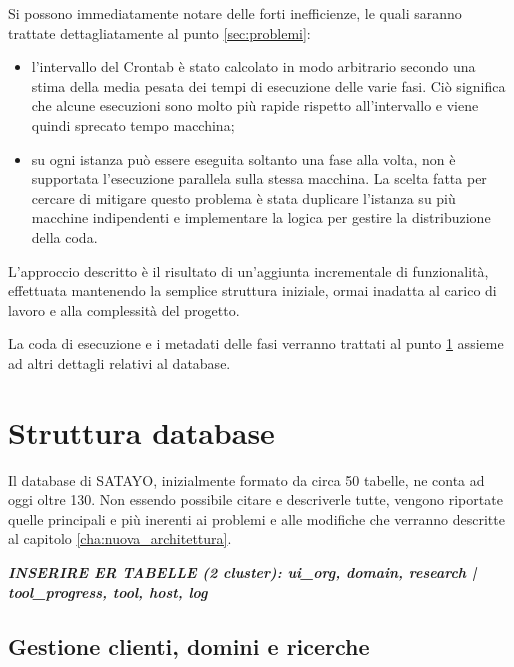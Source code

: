 Si possono immediatamente notare delle forti inefficienze, le quali saranno trattate
dettagliatamente al punto \ref{sec:problemi}:
\begin{itemize}
  \item l'intervallo del Crontab è stato calcolato in modo arbitrario secondo una
    stima della media pesata dei tempi di esecuzione delle varie fasi. Ciò
    significa che alcune esecuzioni sono molto più rapide rispetto all'intervallo
    e viene quindi sprecato tempo macchina;

  \item su ogni istanza può essere eseguita soltanto una fase alla volta, non è
    supportata l'esecuzione parallela sulla stessa macchina. La scelta fatta per
    cercare di mitigare questo problema è stata duplicare l'istanza su più macchine
    indipendenti e implementare la logica per gestire la distribuzione della coda.
\end{itemize}

L'approccio descritto è il risultato di un'aggiunta incrementale di funzionalità,
effettuata mantenendo la semplice struttura iniziale, ormai inadatta al carico di
lavoro e alla complessità del progetto.

La coda di esecuzione e i metadati delle fasi verranno trattati al punto \ref{sec:database}
assieme ad altri dettagli relativi al database.

\section{Struttura database}
\label{sec:database}

Il database di SATAYO, inizialmente formato da circa 50 tabelle, ne conta ad
oggi oltre 130. Non essendo possibile citare e descriverle tutte, vengono riportate
quelle principali e più inerenti ai problemi e alle modifiche che verranno descritte
al capitolo \ref{cha:nuova_architettura}.

\textbf{\textit{INSERIRE ER TABELLE (2 cluster): ui\_org, domain, research | tool\_progress,
tool, host, log}}

\subsection{Gestione clienti, domini e ricerche}
\label{sub:db:mgmt}

